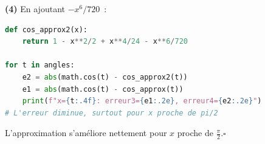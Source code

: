 \textbf{(4)} En ajoutant $-x^6/720$~:
\begin{lstlisting}[language=Python]
def cos_approx2(x):
    return 1 - x**2/2 + x**4/24 - x**6/720

for t in angles:
    e2 = abs(math.cos(t) - cos_approx2(t))
    e1 = abs(math.cos(t) - cos_approx(t))
    print(f"x={t:.4f}: erreur3={e1:.2e}, erreur4={e2:.2e}")
# L'erreur diminue, surtout pour x proche de pi/2
\end{lstlisting}
L'approximation s'am\'eliore nettement pour $x$ proche de $\frac{\pi}{2}$.\hfill$\square$

